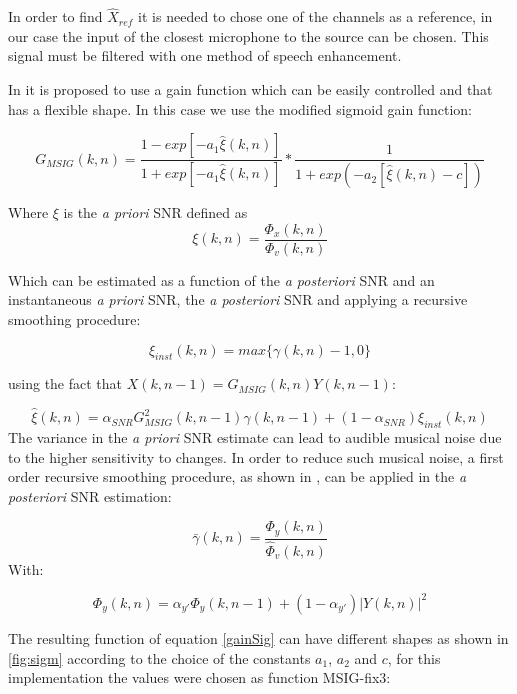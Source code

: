 In order to find $\hat{X}_{ref}$ it is needed to chose one of the channels as a reference, in our case the input  of the closest microphone to the source can be chosen. This signal must be filtered with one method of speech enhancement. 


In \cite{Yong2013OptimizationEnhancement} it is proposed to use a gain function which can be easily controlled and that has a flexible shape.   In this case we use the modified sigmoid gain function:

\begin{equation}
G_{MSIG}(k,n)=\frac{1-exp[-a_1 \hat{\xi}(k,n)]}{1+exp[-a_1 \hat{\xi}(k,n)]}*\frac{1}{1+exp(-a_2 [\hat{\xi}(k,n)-c])}
\label{gainSig}
\end{equation}

Where $\xi$ is the  \textit{a priori} SNR  defined as 
$$\xi(k,n)=\frac{\Phi_x(k,n)}{\Phi_v(k,n)}$$

Which can be estimated as a function of the \textit{a posteriori} SNR and an instantaneous \textit{a priori} SNR, the \textit{a posteriori} SNR and applying a recursive smoothing procedure:

$$\xi_{inst}(k,n)=max\{\gamma(k,n)-1,0\}$$

using the fact that $X(k,n-1)=G_{MSIG}(k,n)Y(k,n-1)$:

$$\hat{\xi}(k,n)=\alpha_{SNR}G_{MSIG}^2(k,n-1)\gamma(k,n-1)+(1-\alpha_{SNR})\xi_{inst}(k,n) $$
The variance in the\textit{ a priori} SNR estimate can lead to audible musical noise due to the higher sensitivity to changes. In order to reduce such musical noise, a first order recursive smoothing procedure, as shown in \cite{Yong2011OnEnhancement}, can be applied in the \textit{a posteriori }SNR estimation:

$$\bar{\gamma}(k,n)=\frac{\Phi_y(k,n)}{\hat{\Phi}_v(k,n)}$$
With:

$$\Phi_y(k,n)=\alpha_{y'}\Phi_y(k,n-1)+(1-\alpha_{y'})|Y(k,n)|^2$$



The resulting function of equation \eqref{gainSig}  can have different shapes as shown in \ref{fig:sigm} according to the choice of the constants $a_1$, $a_2$ and $c$, for this implementation the values were chosen as function MSIG-fix3:


